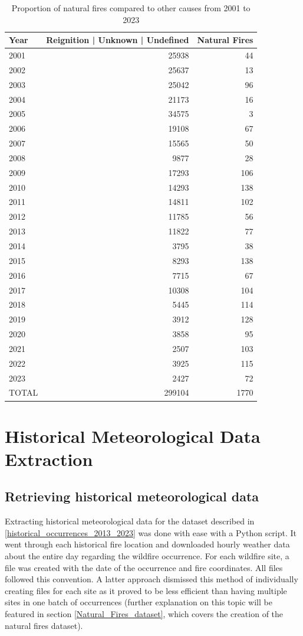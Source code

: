 \begin{table}[H]
	\centering
	\caption{Proportion of natural fires compared to other causes from 2001 to 2023}
	\label{tab:incidents_fires}
	\begin{tabular}{lrr}
		\toprule
		Year & Reignition | Unknown | Undefined & Natural Fires \\
		\midrule
		2001 & 25938 & 44 \\
		2002 & 25637 & 13 \\
		2003 & 25042 & 96 \\
		2004 & 21173 & 16 \\
		2005 & 34575 & 3 \\
		2006 & 19108 & 67 \\
		2007 & 15565 & 50 \\
		2008 & 9877  & 28 \\
		2009 & 17293 & 106 \\
		2010 & 14293 & 138 \\
		2011 & 14811 & 102 \\
		2012 & 11785 & 56 \\
		2013 & 11822 & 77 \\
		2014 & 3795  & 38 \\
		2015 & 8293  & 138 \\
		2016 & 7715  & 67 \\
		2017 & 10308 & 104 \\
		2018 & 5445  & 114 \\
		2019 & 3912  & 128 \\
		2020 & 3858  & 95 \\
		2021 & 2507  & 103 \\
		2022 & 3925  & 115 \\
		2023 & 2427  & 72 \\
		\midrule
		TOTAL & 299104 & 1770 \\
		\bottomrule
	\end{tabular}
	
\end{table}

\section{Historical Meteorological Data Extraction}

\subsection{Retrieving historical meteorological data}
Extracting historical meteorological data for the dataset described in \ref{historical_occurrences_2013_2023} was done with ease with a Python script. It went through each historical fire location and downloaded hourly weather data about the entire day regarding the wildfire occurrence. For each wildfire site, a file was created with the date of the occurrence and fire coordinates. All files followed this convention. A latter approach dismissed this method of individually creating files for each site as it proved to be less efficient than having multiple sites in one batch of occurrences (further explanation on this topic will be featured in section \ref{Natural_Fires_dataset}, which covers the creation of the natural fires dataset). 


